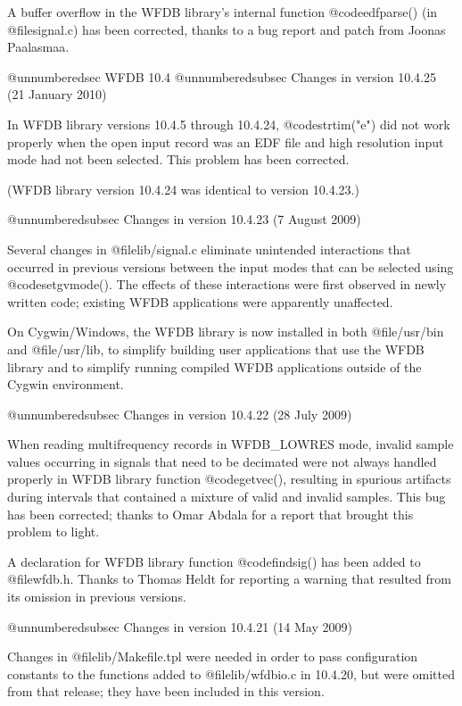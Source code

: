 {{{{{{{{A buffer overflow in the WFDB library's internal function @code{edfparse()}
(in @file{signal.c}) has been corrected, thanks to a bug report and patch
from Joonas Paalasmaa.

@unnumberedsec WFDB 10.4
@unnumberedsubsec Changes in version 10.4.25 (21 January 2010)

In WFDB library versions 10.4.5 through 10.4.24, @code{strtim("e")} did not
work properly when the open input record was an EDF file and high
resolution input mode had not been selected.  This problem has been
corrected.

(WFDB library version 10.4.24 was identical to version 10.4.23.)

@unnumberedsubsec Changes in version 10.4.23 (7 August 2009)

Several changes in @file{lib/signal.c} eliminate unintended interactions that
occurred in previous versions between the input modes that can be
selected using @code{setgvmode()}.  The effects of these interactions were
first observed in newly written code; existing WFDB applications were
apparently unaffected.

On Cygwin/Windows, the WFDB library is now installed in both @file{/usr/bin}
and @file{/usr/lib}, to simplify building user applications that use the WFDB
library and to simplify running compiled WFDB applications outside of
the Cygwin environment.
	
@unnumberedsubsec Changes in version 10.4.22 (28 July 2009)

When reading multifrequency records in WFDB_LOWRES mode, invalid
sample values occurring in signals that need to be decimated were not
always handled properly in WFDB library function @code{getvec()}, resulting
in spurious artifacts during intervals that contained a mixture of
valid and invalid samples.  This bug has been corrected; thanks to
Omar Abdala for a report that brought this problem to light.

A declaration for WFDB library function @code{findsig()} has been added
to @file{wfdb.h}.  Thanks to Thomas Heldt for reporting a warning that
resulted from its omission in previous versions.

@unnumberedsubsec Changes in version 10.4.21 (14 May 2009)

Changes in @file{lib/Makefile.tpl} were needed in order to pass configuration
constants to the functions added to @file{lib/wfdbio.c} in 10.4.20, but were
omitted from that release; they have been included in this version.

}}}}}}}}
